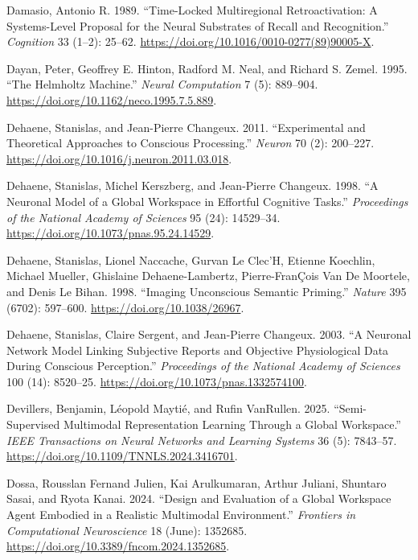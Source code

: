 \documentclass[
  a4paper]{article}
\newlength{\cslhangindent}
\newenvironment{CSLReferences}[2] %
 {\begin{list}{}{%
  \setlength{\itemindent}{0pt}
  \setlength{\leftmargin}{0pt}
  \setlength{\parsep}{0pt}
  \ifodd #1
   \setlength{\leftmargin}{\cslhangindent}
   \setlength{\itemindent}{-1\cslhangindent}
  \fi
  \setlength{\itemsep}{#2\baselineskip}}}
 {\end{list}}
\begin{document}
\begin{CSLReferences}{1}{0}
Damasio, Antonio R. 1989. {``Time-Locked Multiregional Retroactivation:
A Systems-Level Proposal for the Neural Substrates of Recall and
Recognition.''} \emph{Cognition} 33 (1--2): 25--62.
\url{https://doi.org/10.1016/0010-0277(89)90005-X}.

Dayan, Peter, Geoffrey E. Hinton, Radford M. Neal, and Richard S. Zemel.
1995. {``The Helmholtz Machine.''} \emph{Neural Computation} 7 (5):
889--904. \url{https://doi.org/10.1162/neco.1995.7.5.889}.

Dehaene, Stanislas, and Jean-Pierre Changeux. 2011. {``Experimental and
Theoretical Approaches to Conscious Processing.''} \emph{Neuron} 70 (2):
200--227. \url{https://doi.org/10.1016/j.neuron.2011.03.018}.

Dehaene, Stanislas, Michel Kerszberg, and Jean-Pierre Changeux. 1998.
{``A Neuronal Model of a Global Workspace in Effortful Cognitive
Tasks.''} \emph{Proceedings of the National Academy of Sciences} 95
(24): 14529--34. \url{https://doi.org/10.1073/pnas.95.24.14529}.

Dehaene, Stanislas, Lionel Naccache, Gurvan Le Clec'H, Etienne Koechlin,
Michael Mueller, Ghislaine Dehaene-Lambertz, Pierre-FranÇois Van De
Moortele, and Denis Le Bihan. 1998. {``Imaging Unconscious Semantic
Priming.''} \emph{Nature} 395 (6702): 597--600.
\url{https://doi.org/10.1038/26967}.

Dehaene, Stanislas, Claire Sergent, and Jean-Pierre Changeux. 2003. {``A
Neuronal Network Model Linking Subjective Reports and Objective
Physiological Data During Conscious Perception.''} \emph{Proceedings of
the National Academy of Sciences} 100 (14): 8520--25.
\url{https://doi.org/10.1073/pnas.1332574100}.

Devillers, Benjamin, Léopold Maytié, and Rufin VanRullen. 2025.
{``Semi-Supervised Multimodal Representation Learning Through a Global
Workspace.''} \emph{IEEE Transactions on Neural Networks and Learning
Systems} 36 (5): 7843--57.
\url{https://doi.org/10.1109/TNNLS.2024.3416701}.

Dossa, Rousslan Fernand Julien, Kai Arulkumaran, Arthur Juliani,
Shuntaro Sasai, and Ryota Kanai. 2024. {``Design and Evaluation of a
Global Workspace Agent Embodied in a Realistic Multimodal
Environment.''} \emph{Frontiers in Computational Neuroscience} 18
(June): 1352685. \url{https://doi.org/10.3389/fncom.2024.1352685}.


\end{CSLReferences}
\end{document}
